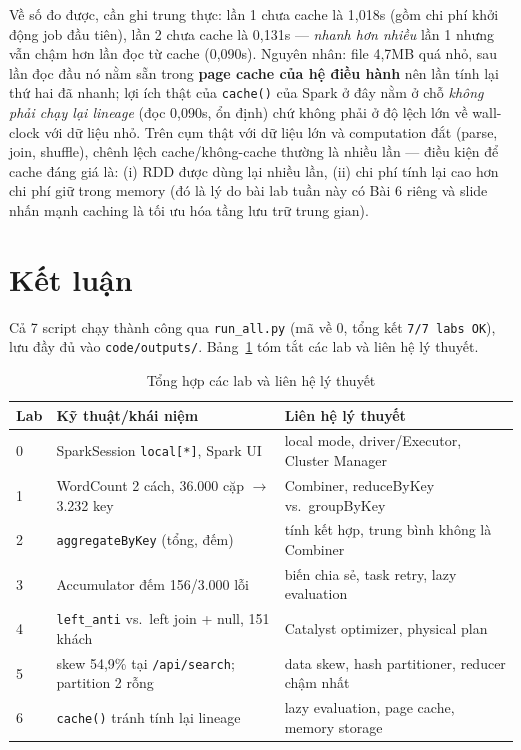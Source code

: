 \documentclass[12pt,a4paper,oneside]{article}
\begin{document}
Về số đo được, cần ghi trung thực: lần 1 chưa cache là 1,018s (gồm chi phí khởi động job đầu tiên), lần 2 chưa cache là 0,131s --- \emph{nhanh hơn nhiều} lần 1 nhưng vẫn chậm hơn lần đọc từ cache (0,090s). Nguyên nhân: file 4,7MB quá nhỏ, sau lần đọc đầu nó nằm sẵn trong \textbf{page cache của hệ điều hành} nên lần tính lại thứ hai đã nhanh; lợi ích thật của \texttt{cache()} của Spark ở đây nằm ở chỗ \emph{không phải chạy lại lineage} (đọc 0,090s, ổn định) chứ không phải ở độ lệch lớn về wall-clock với dữ liệu nhỏ. Trên cụm thật với dữ liệu lớn và computation đắt (parse, join, shuffle), chênh lệch cache/không-cache thường là nhiều lần --- điều kiện để cache đáng giá là: (i) RDD được dùng lại nhiều lần, (ii) chi phí tính lại cao hơn chi phí giữ trong memory (đó là lý do bài lab tuần này có Bài 6 riêng và slide nhấn mạnh caching là tối ưu hóa tầng lưu trữ trung gian).

\section{Kết luận}
\label{sec:ketluan}

Cả 7 script chạy thành công qua \texttt{run\_all.py} (mã về 0, tổng kết \texttt{7/7 labs OK}), lưu đầy đủ vào \texttt{code/outputs/}. Bảng~\ref{tab:tonghop} tóm tắt các lab và liên hệ lý thuyết.

\begin{table}[H]
\centering
\caption{Tổng hợp các lab và liên hệ lý thuyết}
\label{tab:tonghop}
\begin{tabularx}{\textwidth}{l X X}
\toprule
Lab & Kỹ thuật/khái niệm & Liên hệ lý thuyết \\
\midrule
0 & SparkSession \texttt{local[*]}, Spark UI & local mode, driver/Executor, Cluster Manager \\
1 & WordCount 2 cách, 36.000 cặp $\to$ 3.232 key & Combiner, reduceByKey vs.\ groupByKey \\
2 & \texttt{aggregateByKey} (tổng, đếm) & tính kết hợp, trung bình không là Combiner \\
3 & Accumulator đếm 156/3.000 lỗi & biến chia sẻ, task retry, lazy evaluation \\
4 & \texttt{left\_anti} vs.\ left join + null, 151 khách & Catalyst optimizer, physical plan \\
5 & skew 54,9\% tại \texttt{/api/search}; partition 2 rỗng & data skew, hash partitioner, reducer chậm nhất \\
6 & \texttt{cache()} tránh tính lại lineage & lazy evaluation, page cache, memory storage \\
\bottomrule
\end{tabularx}
\end{table}
\end{document}
